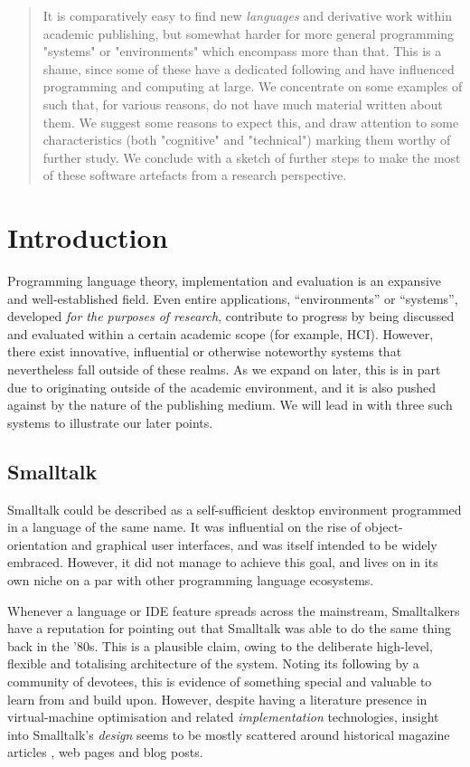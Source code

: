 \begin{abstract}
It is comparatively easy to find new \emph{languages} and derivative work within academic publishing, but somewhat harder for more general programming "systems" or "environments" which encompass more than that. This is a shame, since some of these have a dedicated following and have influenced programming and computing at large. We concentrate on some examples of such that, for various reasons, do not have much material written about them. We suggest some reasons to expect this, and draw attention to some characteristics (both "cognitive" and "technical") marking them worthy of further study. We conclude with a sketch of further steps to make the most of these software artefacts from a research perspective.
\end{abstract}

\hypertarget{introduction}{%
\section{Introduction}\label{introduction}}

Programming language theory, implementation and evaluation is an
expansive and well-established field. Even entire applications,
``environments'' or ``systems'', developed \emph{for the purposes of
research}, contribute to progress by being discussed and evaluated
within a certain academic scope (for example, HCI). However, there exist
innovative, influential or otherwise noteworthy systems that
nevertheless fall outside of these realms. As we expand on later, this
is in part due to originating outside of the academic environment, and
it is also pushed against by the nature of the publishing medium. We
will lead in with three such systems to illustrate our later points.

\hypertarget{smalltalk}{%
\subsection{Smalltalk}\label{smalltalk}}

Smalltalk could be described as a self-sufficient desktop environment
programmed in a language of the same name. It was influential on the
rise of object-orientation and graphical user interfaces, and was itself
intended to be widely embraced. However, it did not manage to achieve
this goal, and lives on in its own niche on a par with other programming
language ecosystems.

Whenever a language or IDE feature spreads across the mainstream,
Smalltalkers have a reputation for pointing out that Smalltalk was able
to do the same thing back in the '80s. This is a plausible claim, owing
to the deliberate high-level, flexible and totalising architecture of
the system. Noting its following by a community of devotees, this is
evidence of something special and valuable to learn from and build upon.
However, despite having a literature presence in virtual-machine
optimisation and related \emph{implementation} technologies, insight
into Smalltalk's \emph{design} seems to be mostly scattered around
historical magazine articles \cite{BYTEmag}, web pages and blog posts.

